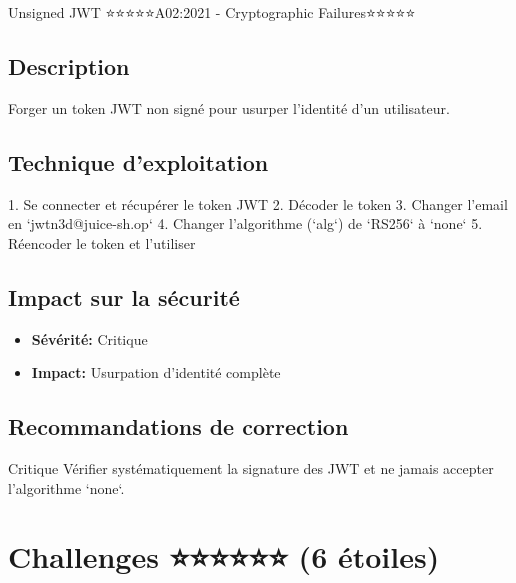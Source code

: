\begin{vulnerability}{Unsigned JWT ⭐⭐⭐⭐⭐}{A02:2021 - Cryptographic Failures}{⭐⭐⭐⭐⭐}
    \subsection*{Description}
    Forger un token JWT non signé pour usurper l'identité d'un utilisateur.
    
    \subsection*{Technique d'exploitation}
    1. Se connecter et récupérer le token JWT
    2. Décoder le token
    3. Changer l'email en `jwtn3d@juice-sh.op`
    4. Changer l'algorithme (`alg`) de `RS256` à `none`
    5. Réencoder le token et l'utiliser
    
    \subsection*{Impact sur la sécurité}
    \begin{itemize}
        \item \textbf{Sévérité:} Critique
        \item \textbf{Impact:} Usurpation d'identité complète
    \end{itemize}
    
    \subsection*{Recommandations de correction}
    \begin{recommendation}{Critique}
        Vérifier systématiquement la signature des JWT et ne jamais accepter l'algorithme `none`.
    \end{recommendation}
\end{vulnerability}

\section{Challenges ⭐⭐⭐⭐⭐⭐ (6 étoiles)}

